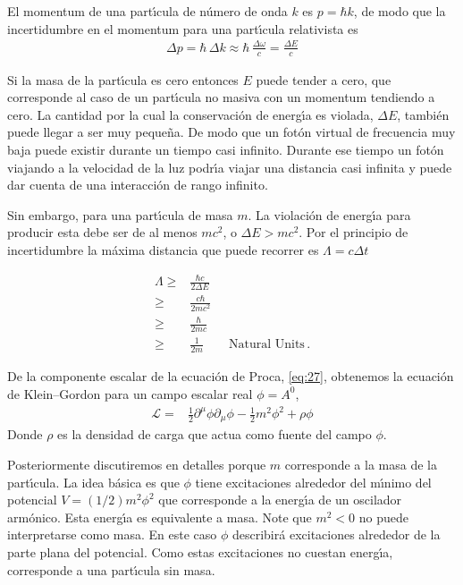 El momentum de una part\'\i cula de n\'umero de onda $k$ es $p=\hbar k$, de modo que la incertidumbre en el momentum para una part\'\i cula relativista es
\begin{align}
  \Delta p=\hbar\, \Delta k \approx\hbar\, \frac{\Delta\omega}{c}=\frac{\Delta E}{c}
\end{align}

Si la masa de la part\'\i cula es cero entonces $E$ puede tender a cero, que corresponde al caso de un part\'\i cula no masiva con un momentum tendiendo a cero. La cantidad por la cual la conservaci\'on de energ\'\i a es violada, $\Delta E$, tambi\'en puede llegar a ser muy peque\~na. De modo que un fot\'on virtual de frecuencia muy baja puede existir durante un tiempo casi infinito. Durante ese tiempo un fot\'on viajando a la velocidad de la luz podr\'\i a viajar una distancia casi infinita y puede dar cuenta de una interacci\'on de rango infinito. 

Sin embargo, para una part\'\i cula de masa $m$. La violaci\'on de energ\'\i a para producir esta debe ser de al menos $mc^2$, o $\Delta E>mc^2$. Por el principio de incertidumbre la m\'axima distancia que puede recorrer es $\Lambda=c\Delta t$

\begin{align}
\label{eq:244}
  \Lambda \geq & \frac{\hbar c}{2\Delta E}\nonumber\\
  \geq &\frac{c\hbar}{2mc^2}\nonumber\\
  \geq &\frac{\hbar}{2mc}\nonumber\\
  \geq &\frac{1}{2m}\qquad\text{Natural Units} \,.
\end{align}

De la componente escalar de la ecuaci\'on de Proca, \eqref{eq:27}, obtenemos la ecuaci\'on de Klein--Gordon para un campo escalar real $\phi=A^0$,
\begin{align}
  \label{eq:29}
  \mathcal{L}=&\frac{1}{2}\partial^\mu\phi\partial_\mu\phi-\frac{1}{2}m^2\phi^2+\rho\phi
\end{align}
Donde $\rho$ es la densidad de carga que actua como fuente del campo $\phi$.

Posteriormente discutiremos en detalles porque $m$ corresponde a la masa de la part\'\i cula. La idea b\'asica es que $\phi$ tiene excitaciones alrededor del m\'\i nimo del potencial $V=(1/2)m^2\phi^2$ que corresponde a la energ\'\i a de un oscilador arm\'onico. Esta energ\'\i a es equivalente a masa. Note que $m^2\lt 0$ no puede interpretarse como masa. En este caso $\phi$ describir\'a excitaciones alrededor de la parte plana del potencial. Como estas excitaciones no cuestan energ\'\i a, corresponde a una part\'\i cula sin masa. 

